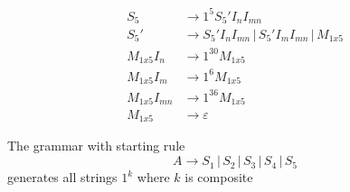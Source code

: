 \documentclass[12pt]{article}
\begin{document}
\begin{align*}
    S_5 &\to  1^5 S_5' I_n I_{mn} \\
    S_5' &\to  S_5'I_n I_{mn} \,|\, S_5'I_m I_{mn} \,|\, M_{1x5} \\
    M_{1x5}I_n &\to 1^{30} M_{1x5} \\
    M_{1x5} I_m &\to 1^6 M_{1x5} \\
    M_{1x5} I_{mn} &\to 1^{36} M_{1x5} \\
    M_{1x5} &\to \varepsilon
\end{align*}

The grammar with starting rule
\begin{equation*}
    A \to S_1 \,|\, S_2 \,|\, S_3 \,|\, S_4 \,|\, S_5
\end{equation*}
generates all strings $1^k$ where $k$ is composite
\end{document}
